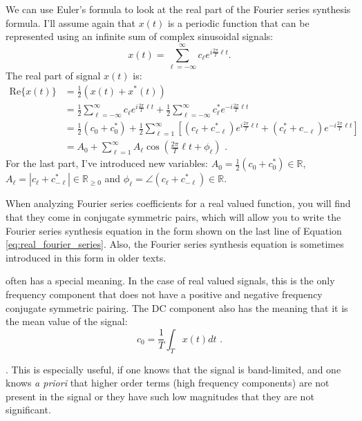  We can use Euler's formula to look at the real part of the Fourier series synthesis formula. I'll assume again that $x(t)$ is a periodic function that can be represented using an infinite sum of complex sinusoidal signals:
\begin{equation}
x(t) = \sum_{\ell = -\infty}^{\infty} c_{\ell} e^{i\frac{2\pi}{T}\ell t}.
\end{equation}
The real part of signal $x(t)$ is:
\begin{align}
\mathrm{Re}\{x(t)\} &= \frac{1}{2} (x(t) + x^*(t)) \\
&= \frac{1}{2}\sum_{\ell=-\infty}^{\infty} c_{\ell} e^{i\frac{2\pi}{T}\ell t} + \frac{1}{2}\sum_{\ell=-\infty}^{\infty} c^*_{\ell} e^{-i\frac{2\pi}{T}\ell t} \\
&= \frac{1}{2}(c_0 + c_0^*) + \frac{1}{2}\sum_{\ell=1}^{\infty}[ (c_{\ell} + c^*_{-\ell}) e^{i\frac{2\pi}{T}\ell t} + (c^*_{\ell} + c_{-\ell}) e^{-i\frac{2\pi}{T}\ell t}]\\
&= A_0 + \sum_{\ell=1}^{\infty} A_\ell \cos\left(\frac{2\pi}{T}\ell t+\phi_\ell\right) \,\,.
\label{eq:real_fourier_series}
\end{align}
For the last part, I've introduced new variables: $A_0= \frac{1}{2}(c_0 + c_0^*) \in \mathbb{R}$, $A_\ell = |c_{\ell} +c^*_{-\ell}|\in \mathbb{R}_{\ge 0}$ and $\phi_\ell = \angle (c_{\ell} + c^*_{-\ell}) \in \mathbb{R}$. 

When analyzing Fourier series coefficients for a real valued function, you will find that they come in conjugate symmetric pairs, which will allow you to write the Fourier series synthesis equation in the form shown on the last line of Equation \ref{eq:real_fourier_series}. Also, the Fourier series synthesis equation is sometimes introduced in this form in older texts.

 often has a special meaning. In the case of real valued signals, this is the only frequency component that does not have a positive and negative frequency conjugate symmetric pairing. The DC component also has the meaning that it is the mean value of the signal:
\begin{equation}
c_0 = \frac{1}{T} \int_{T} x(t) dt \,\,.
\end{equation}

. This is especially useful, if one knows that the signal is band-limited, and one knows \emph{a priori} that higher order terms (high frequency components) are not present in the signal or they have such low magnitudes that they are not significant. 

